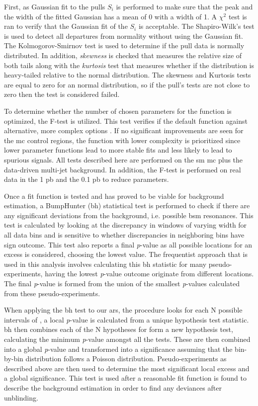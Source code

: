 First, as Gaussian fit to the pulls $S_i$ is performed to make sure that the peak and the width of the fitted Gaussian has a mean of 0 with a width of 1. A $\chi^{\textrm{2}}$ test is ran to verify that the Gaussian
fit of the $S_i$ is acceptable. The Shapiro-Wilk's test is used to detect all departures from normality without using the Gaussian fit. The Kolmogorov-Smirnov test is used to determine if the pull data is 
normally distributed. In addition, \textit{skewness} is checked that measures the relative size of both tails along with the \textit{kurtosis} test that measures whether if the distribution is heavy-tailed 
relative to the normal distribution. The skewness and Kurtosis tests are equal to zero for an normal distribution, so if the pull's tests are not close to zero then the test is considered failed. 
\par
To determine whether the number of chosen parameters for the function is optimized, the F-test is utilized. This test verifies if the default function against alternative, more complex options \cite{f-test}. If no significant 
improvements are seen for the \gls{mc} control regions, the function with lower complexity is prioritized since lower parameter functions lead to more stable fits and less likely to lead to spurious signals. 
All tests described here are performed on the \gls{sm} \gls{mc} plus the data-driven multi-jet background. In addition, the F-test is performed on real data in the 1 pb and the 0.1 pb to reduce parameters. 
\par
Once a fit function is tested and has proved to be viable for background estimation, a BumpHunter (\gls{bh}) statistical test is performed to check if there are any significant deviations from the background, 
i.e. possible \gls{bsm} resonances. This test is calculated by looking at the discrepancy in windows of varying width for all data bins and is sensitive to whether discrepancies in neighboring bins have sign outcome.
This test also reports a final \textit{p}-value as all possible locations for an excess is considered, choosing the lowest value. The frequentist approach that is used in this analysis involves calculating this \gls{bh} statistic for many 
pseudo-experiments, having the lowest \textit{p}-value outcome originate from different locations. The final \textit{p}-value is formed from the union of the smallest \textit{p}-values calculated from these pseudo-experiments. 
\par
When applying the \gls{bh} test to our \gls{ar}s, the procedure looks for each N possible intervals of \mjj, a local \textit{p}-value is calculated from a unique hypothesis test 
statistic. \gls{bh} then combines each of the N hypotheses for form a new hypothesis test, calculating the minimum \textit{p}-value amongst all the tests. These are then 
combined into a global \textit{p}-value and transformed into a significance assuming that the bin-by-bin distribution follows a Poisson distribution. Pseudo-experiments as 
described above are then used to determine the most significant local excess and a global significance. This test is used after a reasonable fit function is found to describe 
the background estimation in order to find any deviances after unblinding. 

